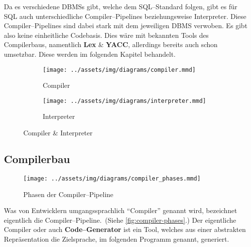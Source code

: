 Da es verschiedene \acp{DBMS} gibt, welche dem \ac{SQL}--Standard folgen, gibt es für \ac{SQL} auch unterschiedliche Compiler--Pipelines beziehungsweise Interpreter.
Diese Compiler--Pipelines sind dabei stark mit dem jeweiligen \ac{DBMS} verwoben.
Es gibt also keine einheitliche Codebasis.
Dies wäre mit bekannten Tools des Compilerbaus, namentlich \textbf{Lex} \& \textbf{\acs{YACC}}, allerdings bereits auch schon umsetzbar.
Diese werden im folgenden Kapitel behandelt.

\begin{figure}[ht]
    \begin{subfigure}[c]{0.5\textwidth}
        \begin{center}
            \texttt{[image: ../assets/img/diagrams/compiler.mmd]}
        \end{center}
        \caption{Compiler}
        \label{subfig:compiler-and-interpreter-compiler}
    \end{subfigure}
    \begin{subfigure}[c]{0.5\textwidth}
        \begin{center}
            \texttt{[image: ../assets/img/diagrams/interpreter.mmd]}
        \end{center}
        \caption{Interpreter}
        \label{subfig:compiler-and-interpreter-interpreter}
    \end{subfigure}
    \caption{Compiler \& Interpreter~\autocite{aho-2006}}
    \label{fig:compiler-and-interpreter}
\end{figure}
\newpage

\subsection{Compilerbau}\label{subsec:compilerbau}
\begin{wrapfigure}{rH}{0.35\textwidth}
    \begin{center}
        \texttt{[image: ../assets/img/diagrams/compiler\_phases.mmd]}
    \end{center}
    \caption{Phasen der Compiler--Pipeline~\autocite{aho-2006}}
    \label{fig:compiler-phases}
\end{wrapfigure}
Was von Entwicklern umgangssprachlich \enquote{Compiler} genannt wird, bezeichnet eigentlich die Compiler--Pipeline.~(Siehe \autoref{fig:compiler-phases}.)
Der eigentliche Compiler oder auch \textbf{Code--Generator} ist ein Tool, welches aus einer abstrakten Repräsentation die Zielsprache, im folgenden Programm genannt, generiert.

